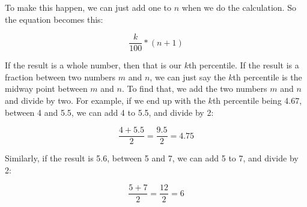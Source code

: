 \documentclass[../../../main.tex]{subfiles}
\begin{document}
To make this happen, we can just add one to $n$ when we do the calculation. So the equation becomes this:

\begin{equation*}
  \frac{k}{100} * (n + 1)
\end{equation*}

\noindent
If the result is a whole number, then that is our $k$th percentile. If the result is a fraction between two numbers $m$ and $n$, we can just say the $k$th percentile is the midway point between $m$ and $n$. To find that, we add the two numbers $m$ and $n$ and divide by two. For example, if we end up with the $k$th percentile being 4.67, between 4 and 5.5, we can add 4 to 5.5, and divide by 2:

\begin{equation*}
  \frac{4 + 5.5}{2} = \frac{9.5}{2} = 4.75
\end{equation*}

\noindent
Similarly, if the result is 5.6, between 5 and 7, we can add 5 to 7, and divide by 2:

\begin{equation*}
  \frac{5 + 7}{2} = \frac{12}{2} = 6
\end{equation*}
\end{document}
